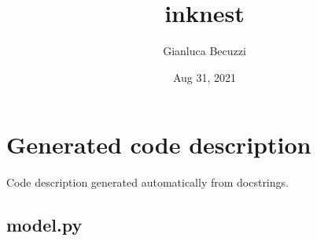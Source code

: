 \documentclass[letterpaper,10pt,english,openany,oneside]{sphinxmanual}
\title{inknest}
\date{Aug 31, 2021}
\author{Gianluca Becuzzi}
\begin{document}
\pagestyle{empty}
\sphinxmaketitle
\pagestyle{plain}
\sphinxtableofcontents
\pagestyle{normal}
\label{\detokenize{index::doc}}



\chapter{Generated code description}
\label{\detokenize{autogen:generated-code-description}}\label{\detokenize{autogen::doc}}
Code description generated automatically from docstrings.


\section{model.py}
\label{\detokenize{autogen:module-model}}\label{\detokenize{autogen:model-py}}
\end{document}
